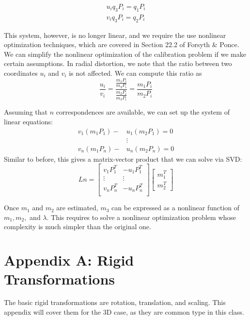 \documentclass[a4paper, 12pt]{article}
\begin{document}
\begin{align*}
    u_iq_3P_i  = q_1P_i\\
    v_iq_3P_i  = q_2P_i
\end{align*}

This system, however, is no longer linear, and we require the use nonlinear optimization techniques, which are covered in Section 22.2 of Forsyth \& Ponce. We can simplify the nonlinear optimization of the calibration problem if we make certain assumptions. In radial distortion, we note that the ratio between two coordinates $u_i$ and $v_i$ is not affected. We can compute this ratio as
\begin{equation}
    \frac{u_i}{v_i} = \frac{\frac{m_1P_i}{m_3P_i}}{\frac{m_2P_i}{m_3P_i}} = \frac{m_1P_i}{m_2P_i}
\end{equation}

Assuming that $n$ correspondences are available, we can set up the system of linear equations:
\begin{align*}
    v_1(m_1P_1)-&u_1(m_2P_1) = 0\\
    &\vdots\\
    v_n(m_1P_n)-&u_n(m_2P_n) = 0
\end{align*}
Similar to before, this gives a matrix-vector product that we can solve via SVD:
\begin{equation}
    Ln = \begin{bmatrix}
    v_1P_1^T & -u_1P_1^T\\
    \vdots & \vdots\\
    v_nP_n^T & -u_nP_n^T\\ 
    \end{bmatrix}
    \begin{bmatrix}
    m_1^T\\m_2^T
    \end{bmatrix}
\end{equation}

Once $m_1$ and $m_2$ are estimated, $m_3$ can be expressed as a nonlinear function of $m_1,m_2,$ and $\lambda$. This requires to solve a nonlinear optimization problem whose complexity is much simpler than the original one.

\section{Appendix A: Rigid Transformations}
The basic rigid transformations are rotation, translation, and scaling. This appendix will cover them for the 3D case, as they are common type in this class. 
\end{document}
